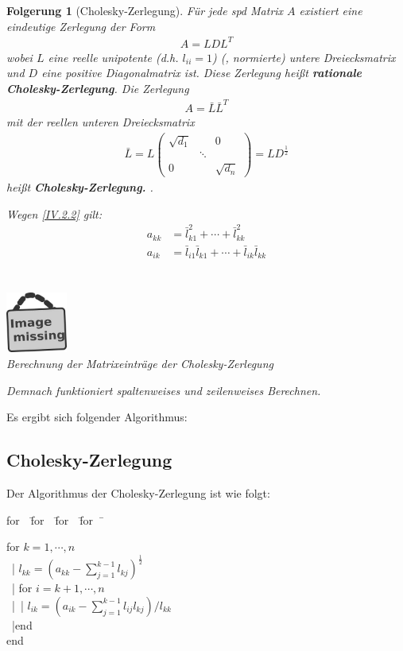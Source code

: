 \documentclass[ngerman,fontsize=11pt, paper=a4, parskip=half, titlepage=true, toc=bib]{scrbook}
\theoremstyle{definition}
\theoremstyle{plain}
\newtheorem{Fol}[Def]{Folgerung}
\newcommand{\subsectione}[1]{\addtocounter{Def}{1}\subsection{#1}}
\newenvironment{Fole}[1][]{ %
	\begin{Fol}[#1]
		}
		{
			\end{Fol}
			\addtocounter{subsection}{1}
			}
\newenvironment{pseudocode}[1]{ %
  \begin{minipage}{#1}
    \begin{framed}
      \hspace*{1em}	
      \begin{minipage}{#1}
        \begin{tabbing}
          for~~\= for~~\= for~~\= for~~\= \kill
	}
	{ %
        \end{tabbing}
      \end{minipage}
      \hspace*{1em}
    \end{framed}
  \end{minipage}
}
\newcommand{\imagemissing}[1]{
  \begin{center}~\\
    \centering 
    \includegraphics[width=2cm]{images/image_missing.jpg}\\
    \textit{#1} \\
  \end{center}
}
\begin{document}
   \begin{Fole}[Cholesky-Zerlegung]
   	\label{4.2.2}
   	Für jede spd Matrix $A$ existiert eine eindeutige Zerlegung der Form 
   	\begin{gather*}
   	A= LDL^T
   	\end{gather*}
   	wobei $L$ eine reelle unipotente (d.h. $l_{ii}=1$)  (, normierte)  untere 
   	Dreiecksmatrix  und $D$ eine positive Diagonalmatrix ist. 
   	Diese Zerlegung heißt \textbf{rationale Cholesky-Zerlegung}. Die Zerlegung
   	\begin{gather}
   	A= \bar{L}\bar{L}^T 
   	\label{IV.2.2}
   	\end{gather}
   	mit der reellen unteren Dreiecksmatrix
   	\begin{gather*}
   	\bar{L} = L \begin{pmatrix}
   	\sqrt{d_1} &&0 \\
   	& \ddots & \\
   	0&& \sqrt{d_n}
   	\end{pmatrix} = LD^{\frac{1}{2}}
   	\end{gather*}
   	heißt \textbf{Cholesky-Zerlegung.} .
   	
   	Wegen \eqref{IV.2.2} gilt: 
   	\begin{align}
   	a_{kk} &= \bar{l}_{k1}^{2} + \cdots +  \bar{l}_{kk}^2  \label{IV.2.3} \\
   	a_{ik} &= \bar{l}_{i1} \bar{l}_{k1} + \cdots + \bar{l}_{ik} \bar{l}_{kk}  \label{IV.2.4} \\
   	\end{align}
   	\imagemissing{Berechnung der Matrixeinträge der Cholesky-Zerlegung}
   	Demnach funktioniert spaltenweises und zeilenweises Berechnen. 
   \end{Fole}
  
  Es ergibt sich folgender Algorithmus:
  
  
  \subsectione{Cholesky-Zerlegung}
  Der Algorithmus der Cholesky-Zerlegung ist wie folgt:
  
  \begin{pseudocode}{0.55\linewidth}
    for  $k=1, \cdots , n$\\
    ~|\> $l_{kk} = (a_{kk}-\sum_{j=1}^{k-1}l_{kj})^{\frac{1}{2}}$ \\
    ~|\> for $i= k+1, \cdots , n$ \\
    ~|\>~|\> $l_{ik} = ( a_{ik}- \sum_{j=1}^{k-1}l_{ij} l_{kj})/{l_{kk}}$  \\
    ~|\>end\\
    end
  \end{pseudocode}
  
\end{document}
